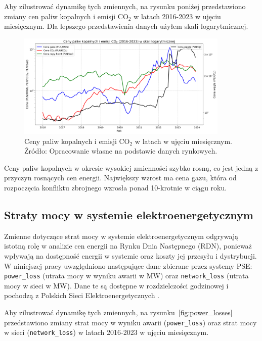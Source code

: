 Aby zilustrować dynamikę tych zmiennych, na rysunku poniżej przedstawiono zmiany cen paliw kopalnych i emisji CO$_2$ w latach 2016-2023 w ujęciu miesięcznym. Dla lepszego przedstawienia danych użyłem skali logarytmicznej.

\begin{figure}[H]
    \centering
    \includegraphics[width=0.9\textwidth]{../plots/fuels/fuel_prices_2016_2024.png}
    \caption{Ceny paliw kopalnych i emisji CO$_2$ w latach w ujęciu miesięcznym. Źródło: Opracowanie własne na podstawie danych rynkowych.}
    \label{fig:fuel_prices}
\end{figure}

Ceny paliw kopalnych w okresie wysokiej zmienności szybko rosną, co jest jedną z przyczyn rosnących cen energii. Największy wzrost ma cena gazu, która od rozpoczęcia konfliktu zbrojnego wzrosła ponad 10-krotnie w ciągu roku. 

\subsection{Straty mocy w systemie elektroenergetycznym}
\label{subsec:losses}

Zmienne dotyczące strat mocy w systemie elektroenergetycznym odgrywają istotną rolę w analizie cen energii na Rynku Dnia Następnego (RDN), ponieważ wpływają na dostępność energii w systemie oraz koszty jej przesyłu i dystrybucji. W niniejszej pracy uwzględniono następujące dane zbierane przez systemy PSE: \texttt{power\_loss} (utrata mocy w wyniku awarii w MW) oraz \texttt{network\_loss} (utrata mocy w sieci w MW). Dane te są dostępne w rozdzielczości godzinowej i pochodzą z Polskich Sieci Elektroenergetycznych \cite{PSEOLD}.

Aby zilustrować dynamikę tych zmiennych, na rysunku~\ref{fig:power_losses} przedstawiono zmiany strat mocy w wyniku awarii (\texttt{power\_loss}) oraz strat mocy w sieci (\texttt{network\_loss}) w latach 2016-2023 w ujęciu miesięcznym.

